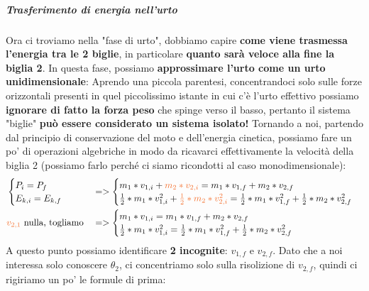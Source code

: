                \subparagraph{Trasferimento di energia nell'urto}
                    Ora ci troviamo nella "fase di urto", dobbiamo capire \textbf{come viene trasmessa l'energia tra le 2 biglie}, in particolare \textbf{quanto sarà veloce alla fine la biglia 2}. In questa fase, possiamo \textbf{approssimare l'urto come un urto unidimensionale}:
                    Aprendo una piccola parentesi, concentrandoci solo sulle forze orizzontali presenti in quel piccolissimo istante in cui c'è l'urto effettivo possiamo \textbf{ignorare di fatto la forza peso} che spinge verso il basso, pertanto il sistema "biglie" \textbf{può essere considerato un sistema isolato!}
                    Tornando a noi, partendo dal principio di conservazione del moto e dell'energia cinetica, possiamo fare un po' di operazioni algebriche in modo da ricavarci effettivamente la velocità della biglia 2 (possiamo farlo perché ci siamo ricondotti al caso monodimensionale):
                    \begin{align*}
                        &\begin{cases}
                            P_i = P_f\\
                            E_{k, i} = E_{k, f}
                        \end{cases}&&=>
                        \begin{cases}
                            m_1*v_{1, i}+\textcolor{Orange}{m_2*v_{2, i}}=m_1*v_{1, f}+m_2*v_{2, f}\\
                            \frac{1}{2}*m_1*v^2_{1, i}+\textcolor{Orange}{\frac{1}{2}*m_2*v^2_{2, i}}=\frac{1}{2}*m_1*v^2_{1, f}+\frac{1}{2}*m_2*v^2_{2, f}
                        \end{cases}\\
                        &\textcolor{Orange}{v_{2, 1}\ } \textrm{nulla, togliamo}&&=>
                        \begin{cases}
                            m_1*v_{1, i}=m_1*v_{1, f}+m_2*v_{2, f}\\
                            \frac{1}{2}*m_1*v^2_{1, i}=\frac{1}{2}*m_1*v^2_{1, f}+\frac{1}{2}*m_2*v^2_{2, f}
                        \end{cases}
                    \end{align*}
                    A questo punto possiamo identificare \textbf{2 incognite}: $v_{1, f}$ e $v_{2, f}$. Dato che a noi interessa solo conoscere $\theta_2$, ci concentriamo solo sulla risolizione di $v_{2, f}$, quindi ci rigiriamo un po' le formule di prima:
